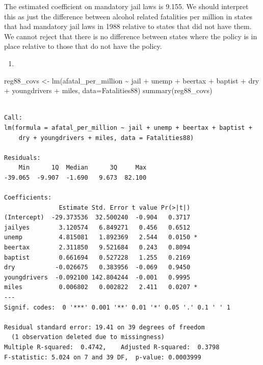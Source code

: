 \documentclass[
  letterpaper,
  DIV=11,
  numbers=noendperiod]{scrreprt}
\newenvironment{Shaded}{\begin{snugshade}}{\end{snugshade}}
\newcommand{\AttributeTok}[1]{\textcolor[rgb]{0.40,0.45,0.13}{#1}}
\newcommand{\FunctionTok}[1]{\textcolor[rgb]{0.28,0.35,0.67}{#1}}
\newcommand{\NormalTok}[1]{\textcolor[rgb]{0.00,0.23,0.31}{#1}}
\newcommand{\OtherTok}[1]{\textcolor[rgb]{0.00,0.23,0.31}{#1}}
\newcommand{\SpecialCharTok}[1]{\textcolor[rgb]{0.37,0.37,0.37}{#1}}
\providecommand{\tightlist}{%
  \setlength{\itemsep}{0pt}\setlength{\parskip}{0pt}}\usepackage{longtable,booktabs,array}
\begin{document}
The estimated coefficient on mandatory jail laws is 9.155. We should
interpret this as just the difference between alcohol related fatalities
per million in states that had mandatory jail laws in 1988 relative to
states that did not have them. We cannot reject that there is no
difference between states where the policy is in place relative to those
that do not have the policy.

\begin{enumerate}
\def\labelenumi{\arabic{enumi}.}
\setcounter{enumi}{2}
\tightlist
\item
\end{enumerate}

\begin{Shaded}
\begin{Highlighting}[]
\NormalTok{reg88\_covs }\OtherTok{\textless{}{-}} \FunctionTok{lm}\NormalTok{(afatal\_per\_million }\SpecialCharTok{\textasciitilde{}}\NormalTok{ jail }\SpecialCharTok{+}\NormalTok{ unemp }\SpecialCharTok{+}\NormalTok{ beertax }\SpecialCharTok{+}\NormalTok{ baptist }\SpecialCharTok{+}\NormalTok{ dry }\SpecialCharTok{+}\NormalTok{ youngdrivers }\SpecialCharTok{+}\NormalTok{ miles, }\AttributeTok{data=}\NormalTok{Fatalities88)}
\FunctionTok{summary}\NormalTok{(reg88\_covs)}
\end{Highlighting}
\end{Shaded}

\begin{verbatim}

Call:
lm(formula = afatal_per_million ~ jail + unemp + beertax + baptist + 
    dry + youngdrivers + miles, data = Fatalities88)

Residuals:
    Min      1Q  Median      3Q     Max 
-39.065  -9.907  -1.690   9.673  82.100 

Coefficients:
               Estimate Std. Error t value Pr(>|t|)  
(Intercept)  -29.373536  32.500240  -0.904   0.3717  
jailyes        3.120574   6.849271   0.456   0.6512  
unemp          4.815081   1.892369   2.544   0.0150 *
beertax        2.311850   9.521684   0.243   0.8094  
baptist        0.661694   0.527228   1.255   0.2169  
dry           -0.026675   0.383956  -0.069   0.9450  
youngdrivers  -0.092100 142.804244  -0.001   0.9995  
miles          0.006802   0.002822   2.411   0.0207 *
---
Signif. codes:  0 '***' 0.001 '**' 0.01 '*' 0.05 '.' 0.1 ' ' 1

Residual standard error: 19.41 on 39 degrees of freedom
  (1 observation deleted due to missingness)
Multiple R-squared:  0.4742,    Adjusted R-squared:  0.3798 
F-statistic: 5.024 on 7 and 39 DF,  p-value: 0.0003999
\end{verbatim}
\end{document}
